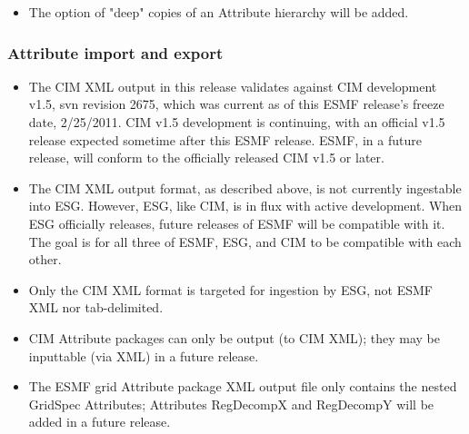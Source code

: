 \begin{itemize}
\item The option of "deep" copies of an Attribute hierarchy will be added.
\end{itemize}


\subsubsection{Attribute import and export}
\begin{itemize}
\item The CIM XML output in this release validates against CIM development v1.5, svn revision 2675, which was current as of this ESMF release's freeze date, 2/25/2011.  CIM v1.5 development is continuing, with an official v1.5 release expected sometime after this ESMF release.  ESMF, in a future release, will conform to the officially released CIM v1.5 or later.
\item The CIM XML output format, as described above, is not currently ingestable into ESG. However, ESG, like CIM, is in flux with active development.  When ESG officially releases, future releases of ESMF will be compatible with it.  The goal is for all three of ESMF, ESG, and CIM to be compatible with each other.
\item Only the CIM XML format is targeted for ingestion by ESG, not ESMF XML nor tab-delimited.
\item CIM Attribute packages can only be output (to CIM XML); they may be inputtable (via XML) in a future release.
\item The ESMF grid Attribute package XML output file only contains the nested GridSpec Attributes; Attributes RegDecompX and RegDecompY will be added in a future release. 
\end{itemize}
